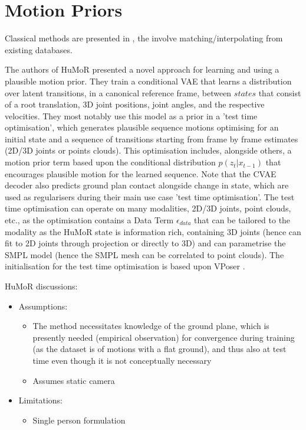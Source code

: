 \section{Motion Priors}

Classical methods are presented in \cite{DeepPhase}, the involve matching/interpolating from existing databases.

The authors of HuMoR \cite{humor} presented a novel approach for learning and using a plausible motion prior. They train a conditional VAE that learns a distribution over latent transitions, in a canonical reference frame, between $\textit{states}$ that consist of a root translation, 3D joint positions, joint angles, and the respective velocities. They most notably use this model as a prior in a 'test time optimisation', which generates plausible sequence motions optimising for an initial state and a sequence of transitions starting from frame by frame estimates (2D/3D joints or points clouds). This optimisation includes, alongside others, a motion prior term based upon the conditional distribution $p(z_t|x_{t-1})$ that encourages plausible motion for the learned sequence. Note that the CVAE decoder also predicts ground plan contact alongside change in state, which are used as regularisers during their main use case 'test time optimisation'. The test time optimisation can operate on many modalities, 2D/3D joints, point clouds, etc., as the optimisation contains a Data Term $\epsilon_{data}$ that can be tailored to the modality as the HuMoR state is information rich, containing 3D joints (hence can fit to 2D joints through projection or directly to 3D) and can parametrise the SMPL model (hence the SMPL mesh can be correlated to point clouds). The initialisation for the test time optimisation is based upon VPoser . 

HuMoR discussions:
\begin{itemize}
    \item Assumptions:
    \begin{itemize}
        \item The method necessitates knowledge of the ground plane, which is presently needed (empirical observation) for convergence during training (as the dataset is of motions with a flat ground), and thus also at test time even though it is not conceptually necessary
        \item Assumes static camera
    \end{itemize}
    \item Limitations:
    \begin{itemize}
        \item Single person formulation
    \end{itemize}
\end{itemize}

